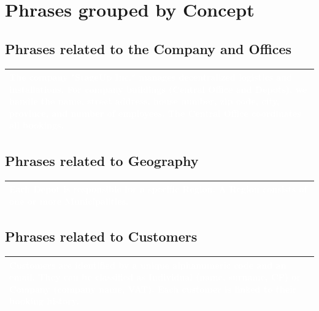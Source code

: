 \documentclass[12pt,a4paper]{article}
\begin{document}
\section{Phrases grouped by Concept}

\subsection*{Phrases related to the Company and Offices}
\begin{center}
\renewcommand{\arraystretch}{1.5}
\small
\begin{tabular}{|p{}|}
\hline
\rowcolor[rgb]{0.1, 0.3, 0.5} \textcolor{white}{The company "StageUp Inc." manages decentralized logistics and installations. For company buildings (Central Office and Depots), we handle the name, street address, house number, zip code, city, province, and number of employees. The Central Office coordinates all bookings.} \\ \hline
\end{tabular}
\end{center}

\subsection*{Phrases related to Geography}
\begin{center}
\renewcommand{\arraystretch}{1.5}
\small
\begin{tabular}{|p{}|}
\hline
\rowcolor[rgb]{0.1, 0.3, 0.5} \textcolor{white}{Each Depot is responsible for a specific Region. A Region consists of one or more Municipalities.} \\ \hline
\end{tabular}
\end{center}

\subsection*{Phrases related to Customers}
\begin{center}
\renewcommand{\arraystretch}{1.5}
\small
\begin{tabular}{|p{}|}
\hline
\rowcolor[rgb]{0.1, 0.3, 0.5} \textcolor{white}{Customers are identified by a unique alphanumeric code and an email. They can be classified as Individual (name, surname, CF) or Company (company name, VAT). Each customer is linked to their booking history.} \\ \hline
\end{tabular}
\end{center}
\end{document}
